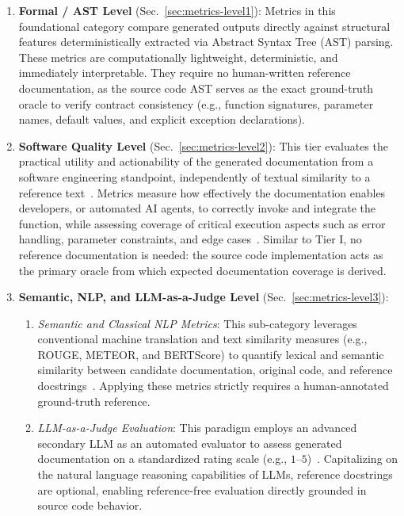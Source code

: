 \begin{enumerate}[label=\Roman*.] 
	\item \textbf{Formal / AST Level} (Sec.~\ref{sec:metrics-level1}): Metrics in this foundational category compare generated outputs directly against structural features deterministically extracted via Abstract Syntax Tree (AST) parsing. These metrics are computationally lightweight, deterministic, and immediately interpretable. They require no human-written reference documentation, as the source code AST serves as the exact ground-truth oracle to verify contract consistency (e.g., function signatures, parameter names, default values, and explicit exception declarations). 
	
	\item \textbf{Software Quality Level} (Sec.~\ref{sec:metrics-level2}): This tier evaluates the practical utility and actionability of the generated documentation from a software engineering standpoint, independently of textual similarity to a reference text~\cite{rai_review_2022}. Metrics measure how effectively the documentation enables developers, or automated AI agents, to correctly invoke and integrate the function, while assessing coverage of critical execution aspects such as error handling, parameter constraints, and edge cases~\cite{yang_docagent_2025}. Similar to Tier I, no reference documentation is needed: the source code implementation acts as the primary oracle from which expected documentation coverage is derived. 
	
	\item \textbf{Semantic, NLP, and LLM-as-a-Judge Level} (Sec.~\ref{sec:metrics-level3}): 
	\begin{enumerate}[label=\alph*.] 
		\item \textit{Semantic and Classical NLP Metrics}: This sub-category leverages conventional machine translation and text similarity measures (e.g., ROUGE, METEOR, and BERTScore) to quantify lexical and semantic similarity between candidate documentation, original code, and reference docstrings~\cite{zhang_survey_2022, zhu_automatic_2019}. Applying these metrics strictly requires a human-annotated ground-truth reference. 
		
		\item \textit{LLM-as-a-Judge Evaluation}: This paradigm employs an advanced secondary LLM as an automated evaluator to assess generated documentation on a standardized rating scale (e.g., $1$--$5$)~\cite{wu_can_2024}. Capitalizing on the natural language reasoning capabilities of LLMs, reference docstrings are optional, enabling reference-free evaluation directly grounded in source code behavior. 
	\end{enumerate} 
	

\end{enumerate}
